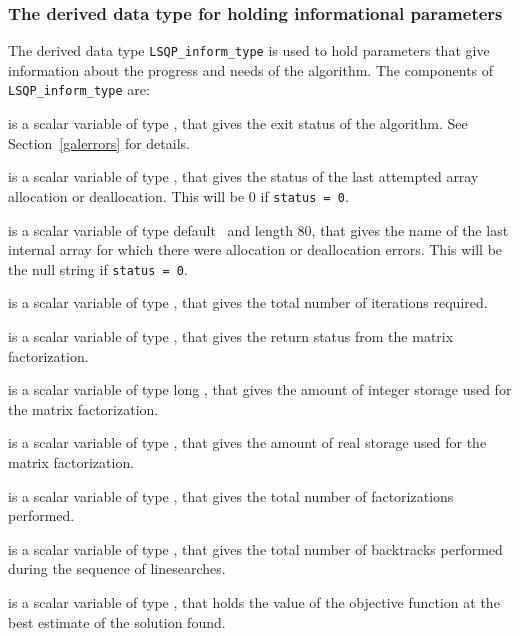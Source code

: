 \documentclass{galahad}
\newcommand{\packagename}{LSQP}
\begin{document}

\subsubsection{The derived data type for holding informational
 parameters}\label{typeinform}
The derived data type 
{\tt \packagename\_inform\_type} 
is used to hold parameters that give information about the progress and needs 
of the algorithm. The components of 
{\tt \packagename\_inform\_type} 
are:

\begin{description}

 is a scalar variable of type \integer, that gives the
exit status of the algorithm. 
See Section~\ref{galerrors}
for details.

 is a scalar variable of type \integer, that gives
the status of the last attempted array allocation or deallocation.
This will be 0 if {\tt status = 0}.

 is a scalar variable of type default \character\
and length 80, that  gives the name of the last internal array 
for which there were allocation or deallocation errors.
This will be the null string if {\tt status = 0}. 

 is a scalar variable of type \integer, that gives the
total number of iterations required.

 is a scalar variable of type \integer, that 
gives the return status from the matrix factorization.

 is a scalar variable of type long
\integer, that gives the amount of integer storage used for the matrix 
factorization.

 is a scalar variable of type \longinteger, 
that gives the amount of real storage used for the matrix factorization.

 is a scalar variable of type \integer, that gives the
total number of factorizations performed.

 is a scalar variable of type \integer, that gives the
total number of backtracks performed during the sequence of linesearches.

 is a scalar variable of type \realdp, that holds the
value of the objective function at the best estimate of the solution found.


\end{description}
\end{document}
